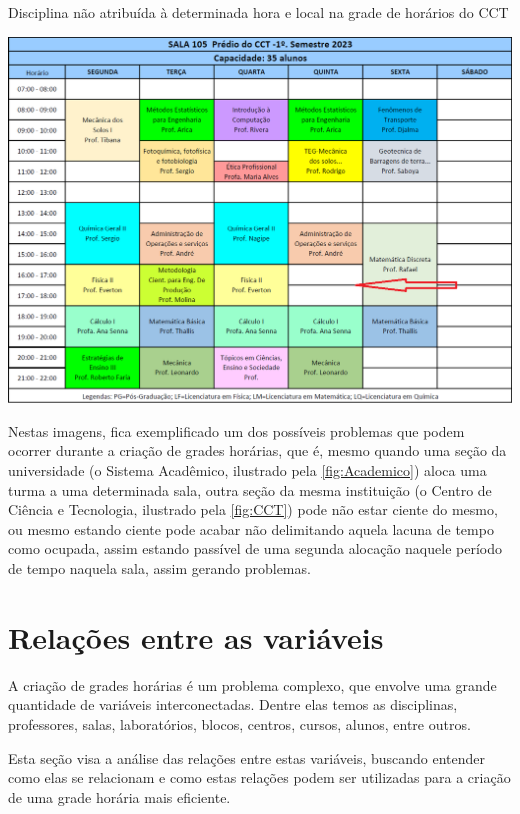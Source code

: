 \begin{MyCenteredFigure}
  \caption{Disciplina não atribuída à determinada hora e local na grade de horários do CCT}
  \label{fig:CCT}
  \includegraphics[width=\textwidth]{files/img/FalhaDeAlocacao/Aulas-CCT-105-2023_1}
\end{MyCenteredFigure}    %

Nestas imagens, fica exemplificado um dos possíveis problemas que podem ocorrer durante a criação de grades horárias, que é, mesmo quando uma seção da universidade (o Sistema Acadêmico, ilustrado pela \autoref{fig:Academico}) aloca uma turma a uma determinada sala, outra seção da mesma instituição (o Centro de Ciência e Tecnologia, ilustrado pela \autoref{fig:CCT}) pode não estar ciente do mesmo, ou mesmo estando ciente pode acabar não delimitando aquela lacuna de tempo como ocupada, assim estando passível de uma segunda alocação naquele período de tempo naquela sala, assim gerando problemas.

\section{Relações entre as variáveis} %

A criação de grades horárias é um problema complexo, que envolve uma grande quantidade de variáveis interconectadas. Dentre elas temos as disciplinas, professores, salas, laboratórios, blocos, centros, cursos, alunos, entre outros.

Esta seção visa a análise das relações entre estas variáveis, buscando entender como elas se relacionam e como estas relações podem ser utilizadas para a criação de uma grade horária mais eficiente.

